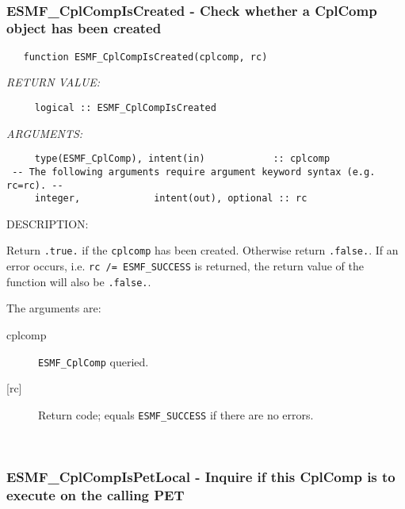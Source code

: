  
\mbox{}\hrulefill\ 
 
\subsubsection [ESMF\_CplCompIsCreated] {ESMF\_CplCompIsCreated - Check whether a CplComp object has been created}


 
\begin{verbatim}   function ESMF_CplCompIsCreated(cplcomp, rc)\end{verbatim}{\em RETURN VALUE:}
\begin{verbatim}     logical :: ESMF_CplCompIsCreated\end{verbatim}{\em ARGUMENTS:}
\begin{verbatim}     type(ESMF_CplComp), intent(in)            :: cplcomp
 -- The following arguments require argument keyword syntax (e.g. rc=rc). --
     integer,             intent(out), optional :: rc
 \end{verbatim}
{\sf DESCRIPTION:\\ }


     Return {\tt .true.} if the {\tt cplcomp} has been created. Otherwise return
     {\tt .false.}. If an error occurs, i.e. {\tt rc /= ESMF\_SUCCESS} is
     returned, the return value of the function will also be {\tt .false.}.
  
   The arguments are:
     \begin{description}
     \item[cplcomp]
       {\tt ESMF\_CplComp} queried.
     \item[{[rc]}]
       Return code; equals {\tt ESMF\_SUCCESS} if there are no errors.
     \end{description}
   
 
\mbox{}\hrulefill\ 
 
\subsubsection [ESMF\_CplCompIsPetLocal] {ESMF\_CplCompIsPetLocal - Inquire if this CplComp is to execute on the calling PET}


